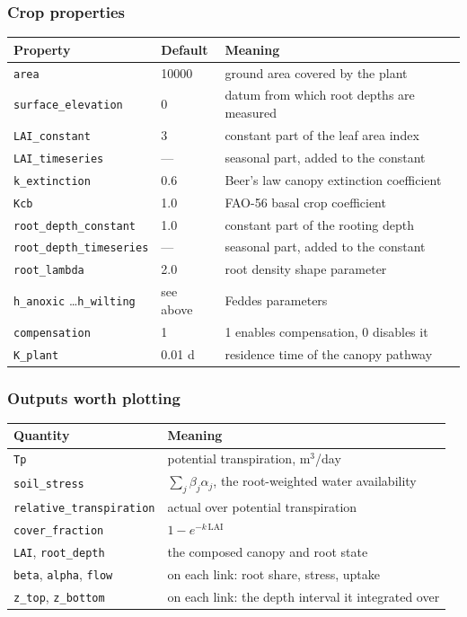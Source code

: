 \documentclass[11pt,a4paper]{article}
\newcommand{\code}[1]{\texttt{\small #1}}
\begin{document}
\subsubsection*{Crop properties}

\begin{longtable}{@{}p{4.3cm}p{2.0cm}p{8.2cm}@{}}
\toprule
\textbf{Property} & \textbf{Default} & \textbf{Meaning} \\
\midrule
\endhead
\code{area}                    & 10000  & ground area covered by the plant \\
\code{surface\_elevation}      & 0      & datum from which root depths are measured \\
\code{LAI\_constant}           & 3      & constant part of the leaf area index \\
\code{LAI\_timeseries}         & ---    & seasonal part, added to the constant \\
\code{k\_extinction}           & 0.6    & Beer's law canopy extinction coefficient \\
\code{Kcb}                     & 1.0    & FAO-56 basal crop coefficient \\
\code{root\_depth\_constant}   & 1.0    & constant part of the rooting depth \\
\code{root\_depth\_timeseries} & ---    & seasonal part, added to the constant \\
\code{root\_lambda}            & 2.0    & root density shape parameter \\
\code{h\_anoxic} \dots \code{h\_wilting} & see above & Feddes parameters \\
\code{compensation}            & 1      & 1 enables compensation, 0 disables it \\
\code{K\_plant}                & 0.01 d & residence time of the canopy pathway \\
\bottomrule
\end{longtable}

\subsubsection*{Outputs worth plotting}

\begin{longtable}{@{}p{4.6cm}p{10.0cm}@{}}
\toprule
\textbf{Quantity} & \textbf{Meaning} \\
\midrule
\endhead
\code{Tp}                     & potential transpiration, m$^3$/day \\
\code{soil\_stress}           & $\sum_j \beta_j \alpha_j$, the root-weighted water availability \\
\code{relative\_transpiration}& actual over potential transpiration \\
\code{cover\_fraction}        & $1 - e^{-k\,\mathrm{LAI}}$ \\
\code{LAI}, \code{root\_depth}& the composed canopy and root state \\
\code{beta}, \code{alpha}, \code{flow} & on each link: root share, stress, uptake \\
\code{z\_top}, \code{z\_bottom}& on each link: the depth interval it integrated over \\
\bottomrule
\end{longtable}
\end{document}

